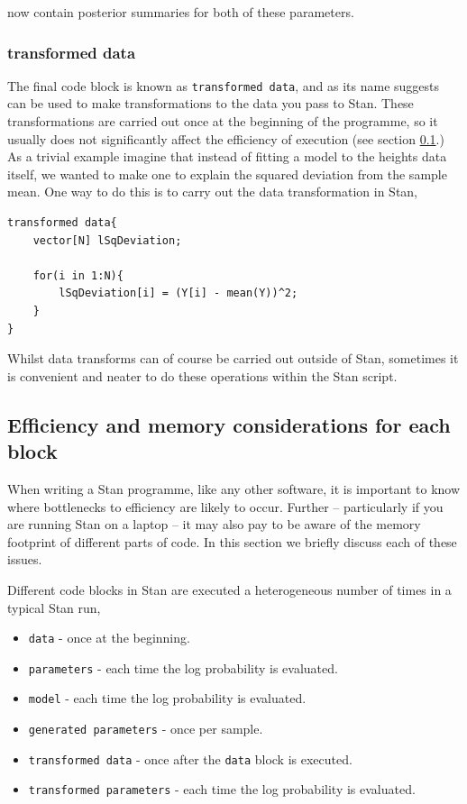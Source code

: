 \documentclass[11pt,fullpage]{book}
\begin{document}
now contain posterior summaries for both of these parameters.

\subsubsection{transformed data}
The final code block is known as \texttt{transformed data}, and as its name suggests can be used to make transformations to the data you pass to Stan. These transformations are carried out once at the beginning of the programme, so it usually does not significantly affect the efficiency of execution (see section \ref{sec:StanJags_efficiency}.) As a trivial example imagine that instead of fitting a model to the heights data itself, we wanted to make one to explain the squared deviation from the sample mean. One way to do this is to carry out the data transformation in Stan,

\begin{verbatim}
transformed data{
    vector[N] lSqDeviation;
    
    for(i in 1:N){
	    lSqDeviation[i] = (Y[i] - mean(Y))^2;
    }
}
\end{verbatim}
Whilst data transforms can of course be carried out outside of Stan, sometimes it is convenient and neater to do these operations within the Stan script.

\subsection{Efficiency and memory considerations for each block}\label{sec:StanJags_efficiency}
When writing a Stan programme, like any other software, it is important to know where bottlenecks to efficiency are likely to occur. Further -- particularly if you are running Stan on a laptop -- it may also pay to be aware of the memory footprint of different parts of code. In this section we briefly discuss each of these issues.

Different code blocks in Stan are executed a heterogeneous number of times in a typical Stan run,

\begin{itemize}
\item \texttt{data} - once at the beginning.
\item \texttt{parameters} - each time the log probability is evaluated.
\item \texttt{model} - each time the log probability is evaluated.
\item \texttt{generated parameters} - once per sample.
\item \texttt{transformed data} - once after the \texttt{data} block is executed.
\item \texttt{transformed parameters} - each time the log probability is evaluated.
\end{itemize} 
\end{document}
